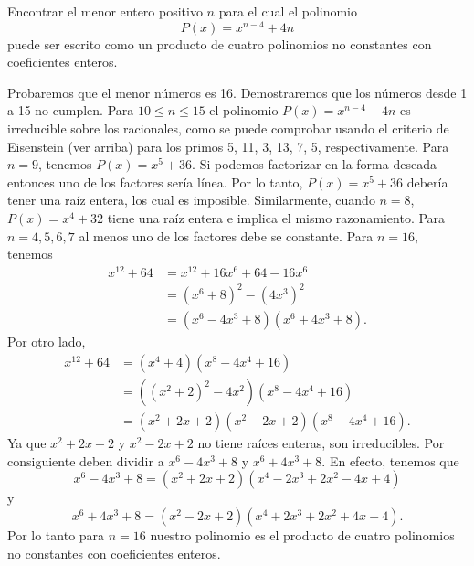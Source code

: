 \begin{example}
    Encontrar el menor entero positivo $n$ para el cual el polinomio
    \[
        P(x) = x^{n - 4} + 4n
    \]
    puede ser escrito como un producto de cuatro polinomios no constantes con coeficientes enteros.
\end{example}
\begin{solution}
    Probaremos que el menor números es 16.
    Demostraremos que los números desde 1 a 15 no cumplen.
    Para $10 \leq n \leq 15$ el polinomio $P(x) = x^{n - 4} + 4n$ es irreducible sobre los racionales, como se puede comprobar usando el criterio de Eisenstein (ver arriba) para los primos 5, 11, 3, 13, 7, 5, respectivamente.
    Para $n = 9$, tenemos $P(x) = x^5 +36$.
    Si podemos factorizar en la forma deseada entonces uno de los factores sería línea.
    Por lo tanto, $P(x) = x^5 + 36$ debería tener una raíz entera, los cual es imposible.
    Similarmente, cuando $n = 8$, $P(x) = x^4 + 32$ tiene una raíz entera e implica el mismo razonamiento.
    Para $n = 4, 5, 6, 7$ al menos uno de los factores debe se constante.
    Para $n = 16$, tenemos
    \begin{align*}
        x^{12} + 64 & = x^{12} + 16x^6 + 64 - 16x^6\\
        & = (x^6 + 8)^2 - (4x^3)^2\\
        & = (x^6 - 4x^3 + 8)(x^6 + 4x^3 + 8).
    \end{align*}
    Por otro lado,
    \begin{align*}
        x^{12} + 64 &= (x^4 + 4)(x^8 - 4x^4 + 16)\\
        &= \left((x^2 + 2)^2 - 4x^2\right)(x^8 - 4x^4 + 16)\\
        &= (x^2 + 2x + 2)(x^2 - 2x + 2)(x^8 - 4x^4 + 16).
    \end{align*}
    Ya que $x^2 + 2x + 2$ y $x^2 - 2x + 2$ no tiene raíces enteras, son irreducibles.
    Por consiguiente deben dividir a $x^6 - 4x^3 + 8$ y $x^6 + 4x^3 + 8$.
    En efecto, tenemos que
    \[
        x^6 - 4x^3 + 8 = (x^2 + 2x + 2)(x^4 - 2x^3 + 2x^2 - 4x + 4)
    \]
    y
    \[
        x^6 + 4x^3 + 8 = (x^2 - 2x + 2)(x^4 + 2x^3 + 2x^2 + 4x + 4).
    \]
    Por lo tanto para $n = 16$ nuestro polinomio es el producto de cuatro polinomios no constantes con coeficientes enteros.
\end{solution}

